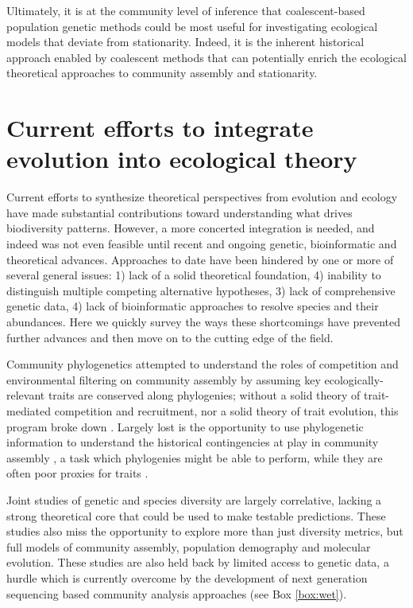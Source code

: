 \documentclass[12pt]{article}
\newcounter{Box}
\begin{document}
Ultimately, it is at the community level of inference that
coalescent-based population genetic methods could be most useful for
investigating ecological models that deviate from
stationarity. Indeed, it is the inherent historical approach enabled
by coalescent methods that can potentially enrich the ecological
theoretical approaches to community assembly and stationarity.


\section{Current efforts to integrate evolution into ecological theory} \label{sec:toDate}

Current efforts to synthesize theoretical perspectives from evolution
and ecology have made substantial contributions toward understanding
what drives biodiversity patterns. However, a more concerted
integration is needed, and indeed was not even feasible until recent
and ongoing genetic, bioinformatic and theoretical
advances. Approaches to date have been hindered by one or more of
several general issues: 1) lack of a solid theoretical foundation, 4)
inability to distinguish multiple competing alternative hypotheses, 3)
lack of comprehensive genetic data, 4) lack of bioinformatic
approaches to resolve species and their abundances. Here we quickly
survey the ways these shortcomings have prevented further advances and
then move on to the cutting edge of the field.

Community phylogenetics \citep{Webb2002-yr} attempted to understand the
roles of competition and environmental filtering on community assembly
by assuming key ecologically-relevant traits are conserved along
phylogenies; without a solid theory of trait-mediated competition and
recruitment, nor a solid theory of trait evolution, this program broke
down \citep{Losos2008-eq}. Largely lost is the opportunity to use
phylogenetic information to understand the historical contingencies at
play in community assembly \citep{Ricklefs2007-wo,Emerson2008-as}, a
task which phylogenies might be able to perform, while they are often
poor proxies for traits \citep{Losos2008-eq}.

Joint studies of genetic and species diversity
\citep{Vanoverbeke2015-ym, Vellend2005-up, Vellend2014-ir,
  Papadopoulou2011-bd} are largely correlative, lacking a strong
theoretical core that could be used to make testable
predictions. These studies also miss the opportunity to explore more
than just diversity metrics, but full models of community assembly,
population demography and molecular evolution.  These studies are also
held back by limited access to genetic data, a hurdle which is
currently overcome by the development of next generation sequencing
based community analysis approaches (see Box \ref{box:wet}).
\end{document}
